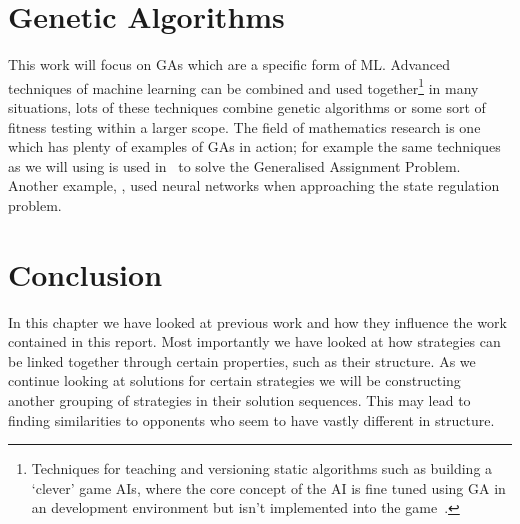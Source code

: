 \section{Genetic Algorithms}
This work will focus on GAs which are a specific form of ML.
Advanced techniques of machine learning can be combined and used together\footnote{Techniques for teaching and versioning static algorithms such as building a `clever' game AIs, where the core concept of the AI is fine tuned using GA in an development environment but isn't implemented into the game~\cite{bakkes2009rapid}.} in many situations, lots of these techniques combine genetic algorithms or some sort of fitness testing within a larger scope.
The field of mathematics research is one which has plenty of examples of GAs in action;
for example the same techniques as we will using is used in~\cite{chu1997genetic} to solve the Generalised Assignment Problem.
Another example, \cite{bhanu1995adaptive}, used neural networks when approaching the state regulation problem.

\section{Conclusion}
In this chapter we have looked at previous work and how they influence the work contained in this report.
Most importantly we have looked at how strategies can be linked together through certain properties, such as their structure.
As we continue looking at solutions for certain strategies we will be constructing another grouping of strategies in their solution sequences.
This may lead to finding similarities to opponents who seem to have vastly different in structure.
